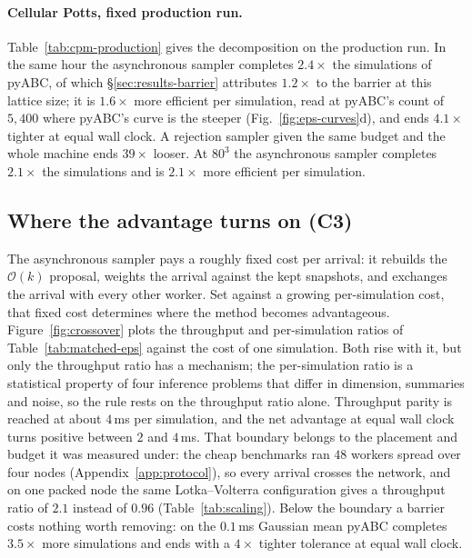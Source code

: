 \documentclass[10pt]{article}
\theoremstyle{plain}
\theoremstyle{definition}
\begin{document}
\paragraph{Cellular Potts, fixed production run.} Table~\ref{tab:cpm-production} gives the decomposition on the production run. In the same hour the asynchronous sampler completes $2.4\times$ the simulations of pyABC, of which \S\ref{sec:results-barrier} attributes $1.2\times$ to the barrier at this lattice size; it is $1.6\times$ more efficient per simulation, read at pyABC's count of $5{,}400$ where pyABC's curve is the steeper (Fig.~\ref{fig:eps-curves}d), and ends $4.1\times$ tighter at equal wall clock. A rejection sampler given the same budget and the whole machine ends $39\times$ looser. At $80^3$ the asynchronous sampler completes $2.1\times$ the simulations and is $2.1\times$ more efficient per simulation.
\subsection{Where the advantage turns on (C3)}\label{sec:results-boundary}

The asynchronous sampler pays a roughly fixed cost per arrival: it rebuilds the $\mathcal{O}(k)$ proposal, weights the arrival against the kept snapshots, and exchanges the arrival with every other worker. Set against a growing per-simulation cost, that fixed cost determines where the method becomes advantageous. Figure~\ref{fig:crossover} plots the throughput and per-simulation ratios of Table~\ref{tab:matched-eps} against the cost of one simulation. Both rise with it, but only the throughput ratio has a mechanism; the per-simulation ratio is a statistical property of four inference problems that differ in dimension, summaries and noise, so the rule rests on the throughput ratio alone. Throughput parity is reached at about $4$\,ms per simulation, and the net advantage at equal wall clock turns positive between $2$ and $4$\,ms. That boundary belongs to the placement and budget it was measured under: the cheap benchmarks ran $48$ workers spread over four nodes (Appendix~\ref{app:protocol}), so every arrival crosses the network, and on one packed node the same Lotka--Volterra configuration gives a throughput ratio of $2.1$ instead of $0.96$ (Table~\ref{tab:scaling}). Below the boundary a barrier costs nothing worth removing: on the $0.1$\,ms Gaussian mean pyABC completes $3.5\times$ more simulations and ends with a $4\times$ tighter tolerance at equal wall clock.
\end{document}
